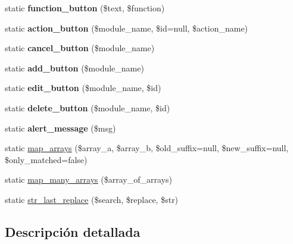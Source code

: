 \begin{DoxyCompactItemize}
\item 
\mbox{\label{class_component_ae58c325e2b8d63fa0c912c909dfc4844}} 
static {\bfseries function\+\_\+button} (\$text, \$function)
\item 
\mbox{\label{class_component_a86649b27c4e2418877d523f60460e9b9}} 
static {\bfseries action\+\_\+button} (\$module\+\_\+name, \$id=null, \$action\+\_\+name)
\item 
\mbox{\label{class_component_ad36eae0f372fbb421d87eee76bc6209a}} 
static {\bfseries cancel\+\_\+button} (\$module\+\_\+name)
\item 
\mbox{\label{class_component_ae10dcbce31b4ec1f520bd65a2c7cbcf6}} 
static {\bfseries add\+\_\+button} (\$module\+\_\+name)
\item 
\mbox{\label{class_component_acfded6240653626b9230402edda32dcb}} 
static {\bfseries edit\+\_\+button} (\$module\+\_\+name, \$id)
\item 
\mbox{\label{class_component_ad4be83d924fdeec6c86255748315fde2}} 
static {\bfseries delete\+\_\+button} (\$module\+\_\+name, \$id)
\item 
\mbox{\label{class_component_ab06d73bf19257f1ced9a74f318720cd1}} 
static {\bfseries alert\+\_\+message} (\$msg)
\item 
static \mbox{\hyperlink{class_component_af653678b68f3c0a105ee403a242c2958}{map\+\_\+arrays}} (\$array\+\_\+a, \$array\+\_\+b, \$old\+\_\+suffix=null, \$new\+\_\+suffix=null, \$only\+\_\+matched=false)
\item 
static \mbox{\hyperlink{class_component_ab24893f7efe63552c37b7d35104f53c7}{map\+\_\+many\+\_\+arrays}} (\$array\+\_\+of\+\_\+arrays)
\item 
static \mbox{\hyperlink{class_component_a1fecda46a9e46fdcf102ab6cffb262aa}{str\+\_\+last\+\_\+replace}} (\$search, \$replace, \$str)
\end{DoxyCompactItemize}


\subsection{Descripción detallada}


